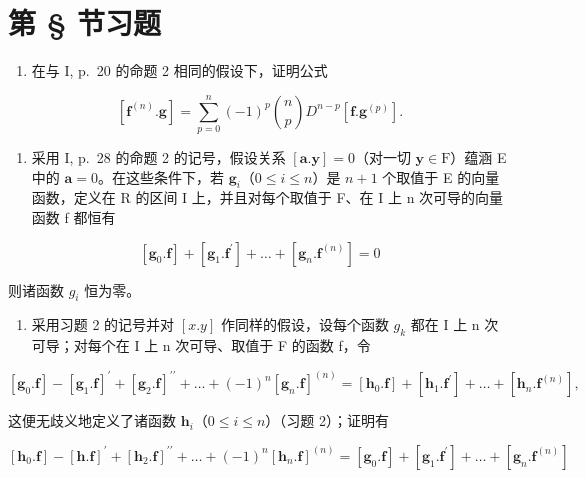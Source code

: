 \section*{第 \S{} 节习题}
{}

\begin{enumerate}
\def\labelenumi{\arabic{enumi})}
\tightlist
\item
  在与 I, p.~20 的命题 2 相同的假设下，证明公式
\end{enumerate}

\[
[ \mathbf {f} ^ {(n)}. \mathbf {g} ] = \sum_ {p = 0} ^ {n} (- 1) ^ {p} \binom {n} {p} D ^ {n - p} [ \mathbf {f}. \mathbf {g} ^ {(p)} ].
\]

\begin{enumerate}
\def\labelenumi{\arabic{enumi})}
\setcounter{enumi}{1}
\tightlist
\item
  采用 I, p.~28 的命题 2 的记号，假设关系 \([\mathbf{a}.\mathbf{y}] = 0\)（对一切 \(\mathbf{y} \in \mathrm{F}\)）蕴涵 E 中的 \(\mathbf{a} = 0\)。在这些条件下，若 \(\mathbf{g}_i\)（\(0 \leqslant i \leqslant n\)）是 \(n + 1\) 个取值于 E 的向量函数，定义在 R 的区间 I 上，并且对每个取值于 F、在 I 上 n 次可导的向量函数 f 都恒有
\end{enumerate}

\[
[ \mathbf {g} _ {0}. \mathbf {f} ] + [ \mathbf {g} _ {1}. \mathbf {f} ^ {\prime} ] + \dots + [ \mathbf {g} _ {n}. \mathbf {f} ^ {(n)} ] = 0
\]

则诸函数 \(g_{i}\) 恒为零。

\begin{enumerate}
\def\labelenumi{\arabic{enumi})}
\setcounter{enumi}{2}
\tightlist
\item
  采用习题 2 的记号并对 \([x.y]\) 作同样的假设，设每个函数 \(g_{k}\) 都在 I 上 n 次可导；对每个在 I 上 n 次可导、取值于 F 的函数 f，令
\end{enumerate}

\[
[ \mathbf {g} _ {0}. \mathbf {f} ] - [ \mathbf {g} _ {1}. \mathbf {f} ] ^ {\prime} + [ \mathbf {g} _ {2}. \mathbf {f} ] ^ {\prime \prime} + \dots + (- 1) ^ {n} [ \mathbf {g} _ {n}. \mathbf {f} ] ^ {(n)} = [ \mathbf {h} _ {0}. \mathbf {f} ] + [ \mathbf {h} _ {1}. \mathbf {f} ^ {\prime} ] + \dots + [ \mathbf {h} _ {n}. \mathbf {f} ^ {(n)} ],
\]

这便无歧义地定义了诸函数 \(\mathbf{h}_i\)（\(0 \leqslant i \leqslant n\)）（习题 2）；证明有

\[
[ \mathbf {h} _ {0}. \mathbf {f} ] - [ \mathbf {h}. \mathbf {f} ] ^ {\prime} + [ \mathbf {h} _ {2}. \mathbf {f} ] ^ {\prime \prime} + \dots + (- 1) ^ {n} [ \mathbf {h} _ {n}. \mathbf {f} ] ^ {(n)} = [ \mathbf {g} _ {0}. \mathbf {f} ] + [ \mathbf {g} _ {1}. \mathbf {f} ^ {\prime} ] + \dots + [ \mathbf {g} _ {n}. \mathbf {f} ^ {(n)} ]
\]

